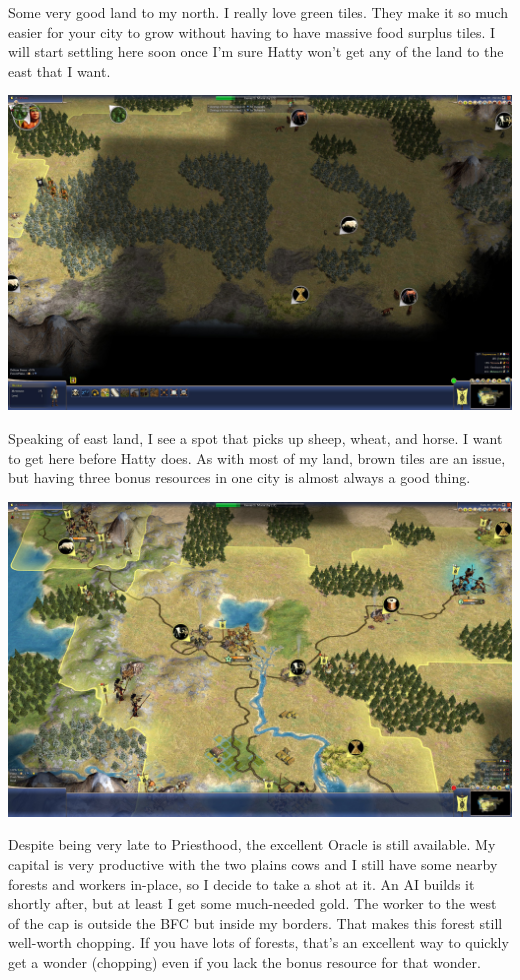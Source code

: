 \documentclass[10pt]{article}
\begin{document}
Some very good land to my north. I really love green tiles. They make it so much easier for your city
to grow without having to have massive food surplus tiles. I will start settling here soon once I'm sure
Hatty won't get any of the land to the east that I want.

\includegraphics[width=1.0\textwidth]{46}

Speaking of east land, I see a spot that picks up sheep, wheat, and horse. I want to get here before
Hatty does. As with most of my land, brown tiles are an issue, but having three bonus resources in
one city is almost always a good thing.

\includegraphics[width=1.0\textwidth]{48}

Despite being very late to Priesthood, the excellent Oracle is still available. My capital is very productive
with the two plains cows and I still have some nearby forests and workers in-place, so I decide to take a
shot at it. An AI builds it shortly after, but at least I get some much-needed gold. The worker to the west
of the cap is outside the BFC but inside my borders. That makes this forest still well-worth chopping.
If you have lots of forests, that's an excellent way to quickly get a wonder (chopping) even if you lack
the bonus resource for that wonder.
\end{document}
